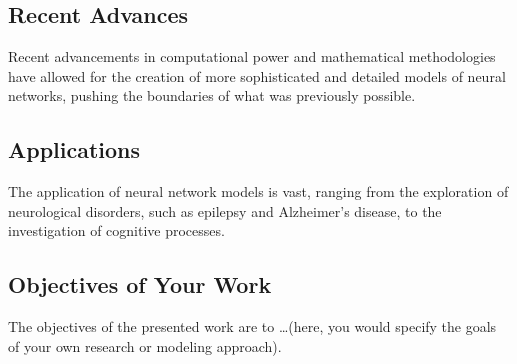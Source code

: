 \documentclass[paper=a4, fontsize=11pt]{scrartcl} %
\numberwithin{equation}{section} %
\numberwithin{figure}{section} %
\numberwithin{table}{section} %
\begin{document}
\subsection{Recent Advances}
Recent advancements in computational power and mathematical methodologies have allowed for the creation of more sophisticated and detailed models of neural networks, pushing the boundaries of what was previously possible.

\subsection{Applications}
The application of neural network models is vast, ranging from the exploration of neurological disorders, such as epilepsy and Alzheimer’s disease, to the investigation of cognitive processes.

\subsection{Objectives of Your Work}
The objectives of the presented work are to \ldots (here, you would specify the goals of your own research or modeling approach).







\end{document}
